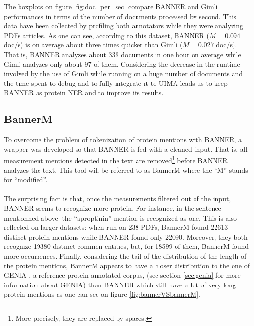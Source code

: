 \documentclass{report}
\begin{document}
					The boxplots
					on figure \ref{fig:doc_per_sec} compare BANNER and Gimli 
					performances in terms of the number of documents processed by 
					second. This data have been collected by profiling both 
					annotators while they were 
					analyzing PDFs articles. As one can see, according to this 
					dataset, BANNER ($M = 0.094$ doc/s) is on average 
					about three times quicker than Gimli ($M=0.027$ doc/s). That 
					is, BANNER analyzes about 338 documents
					in one hour on average while Gimli analyzes only about 97 of 
					them. Considering the decrease in the runtime involved by the use of  Gimli 
					while running on a huge number of documents and the
					time spent to debug and to fully integrate it to UIMA leads us
					to keep BANNER as protein NER and to improve its results.
					
					
					
					
					\subsection{BannerM}
					\label{sec:bannerM}
                    To overcome the problem of tokenization of protein mentions
                    with BANNER, a wrapper was developed so that
                    BANNER is fed with a cleaned input. That is, all 
                    measurement mentions detected in the text are removed\footnote{More precisely, they are replaced by spaces.} 
                    before BANNER analyzes the text. 
                    This tool will be referred to as BannerM where the ``M'' stands for ``modified''.
                                        
                    \paragraph{}The surprising fact is that, once the measurements filtered out of the input, BANNER seems to recognize
                    more protein. For instance, in the sentence mentionned above, the ``aproptinin'' mention is recognized
                    as one. This is also reflected on larger datasets: 
                    when run on 238 PDFs, BannerM found 22613
                    distinct protein mentions while BANNER found only 22090. 
                    Moreover, they both recognize 19380
                                        distinct common entities, but, for 18599 of them, BannerM found more occurrences. Finally, considering the tail
                                        of the distribution of the length of the protein mentions, BannerM appears to have a closer distribution to the
                                        one of GENIA \cite{genia}, a reference protein-annotated corpus, (see section \ref{sec:genia} for more information about GENIA) than BANNER which still have a lot of very long protein mentions as one can see on
                                        figure \ref{fig:bannerVSbannerM}.
\end{document}
